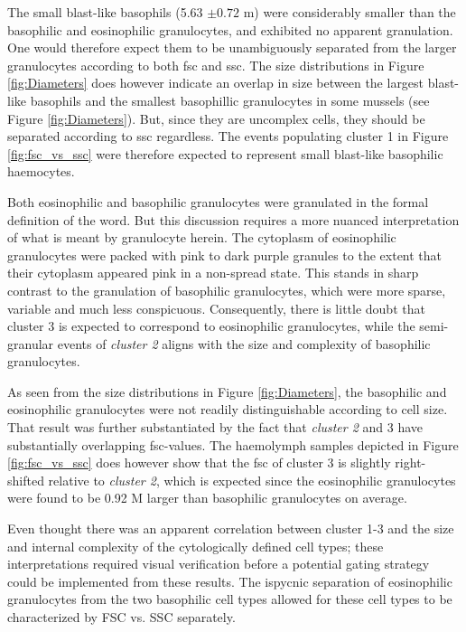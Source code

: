 The small blast-like basophils (5.63 $\pm{0.72}$ \micro m) were considerably smaller than the basophilic and eosinophilic granulocytes, and exhibited no apparent granulation. One would therefore expect them to be unambiguously separated from the larger granulocytes according to both \acrshort{fsc} and \acrshort{ssc}. The size distributions in Figure \ref{fig:Diameters} does however indicate an overlap in size between the largest blast-like basophils and the smallest basophillic granulocytes in some mussels (see Figure \ref{fig:Diameters}). But, since they are uncomplex cells, they should be separated according to \acrshort{ssc} regardless. The events populating cluster 1 in Figure \ref{fig:fsc_vs_ssc} were therefore expected to represent small blast-like basophilic haemocytes. 

Both eosinophilic and basophilic granulocytes were granulated in the formal definition of the word. But this discussion requires a more nuanced interpretation of what is meant by granulocyte herein. The cytoplasm of eosinophilic granulocytes were packed with pink to dark purple granules to the extent that their cytoplasm appeared pink in a non-spread state. This stands in sharp contrast to the granulation of basophilic granulocytes, which were more sparse, variable and much less conspicuous. Consequently, there is little doubt that cluster 3 is expected to correspond to eosinophilic granulocytes, while the semi-granular events of \emph{\emph{cluster 2}} aligns with the size and complexity of basophilic granulocytes.

As seen from the size distributions in Figure \ref{fig:Diameters}, the basophilic and eosinophilic granulocytes were not readily distinguishable according to cell size. That result was further substantiated by the fact that \emph{cluster 2} and 3 have substantially overlapping \acrshort{fsc}-values. The haemolymph samples depicted in Figure \ref{fig:fsc_vs_ssc} does however show that the \acrshort{fsc} of cluster 3 is slightly right-shifted relative to \emph{cluster 2}, which is expected since the eosinophilic granulocytes were found to be 0.92 \micro M larger than basophilic granulocytes on average.

Even thought there was an apparent correlation between cluster 1-3 and the size and internal complexity of the cytologically defined cell types; these interpretations required visual verification before a potential gating strategy could be implemented from these results. The ispycnic separation of eosinophilic granulocytes from the two basophilic cell types allowed for these cell types to be characterized by FSC vs. SSC separately.

